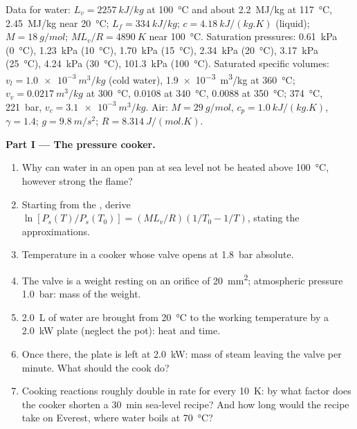 \begin{problem}
\label{pb:b1:phase-changes:1}
Data for water: $L_v = \qty{2257}{kJ/kg}$ at \qty{100}{\degreeCelsius} and
about \qty{2.2}{MJ/kg} at \qty{117}{\degreeCelsius}, \qty{2.45}{MJ/kg} near
\qty{20}{\degreeCelsius}; $L_f = \qty{334}{kJ/kg}$; $c = \qty{4.18}{kJ/(kg.K)}$
(liquid); $M = \qty{18}{g/mol}$; $ML_v/R = \qty{4890}{K}$ near
\qty{100}{\degreeCelsius}. Saturation pressures: \qty{0.61}{kPa}
(\qty{0}{\degreeCelsius}), \qty{1.23}{kPa} (\qty{10}{\degreeCelsius}), \qty{1.70}{kPa} (\qty{15}{\degreeCelsius}),
\qty{2.34}{kPa} (\qty{20}{\degreeCelsius}), \qty{3.17}{kPa} (\qty{25}{\degreeCelsius}), \qty{4.24}{kPa}
(\qty{30}{\degreeCelsius}), \qty{101.3}{kPa} (\qty{100}{\degreeCelsius}).
Saturated specific volumes: $v_l = \qty{1.0e-3}{m^3/kg}$ (cold water),
\qty{1.9e-3}{m^3/kg} at \qty{360}{\degreeCelsius}; $v_v = \qty{0.0217}{m^3/kg}$
at \qty{300}{\degreeCelsius}, $0.0108$ at \qty{340}{\degreeCelsius}, $0.0088$
at \qty{350}{\degreeCelsius};  \qty{374}{\degreeCelsius},
\qty{221}{bar}, $v_c = \qty{3.1e-3}{m^3/kg}$. Air: $M = \qty{29}{g/mol}$, $c_p =
\qty{1.0}{kJ/(kg.K)}$, $\gamma = 1.4$; $g = \qty{9.8}{m/s^2}$; $R =
\qty{8.314}{J/(mol.K)}$.

\medskip
\noindent\textbf{Part I --- The pressure cooker.}
\begin{enumerate}
  \item Why can water in an open pan at sea level not be heated above
        \qty{100}{\degreeCelsius}, however strong the flame?
  \item Starting from the , derive
        $\ln[P_s(T)/P_s(T_0)] = (ML_v/R)(1/T_0 - 1/T)$, stating the
        approximations.
  \item Temperature in a cooker whose valve opens at \qty{1.8}{bar}
        absolute.
  \item The valve is a weight resting on an orifice of \qty{20}{mm^2};
        atmospheric pressure \qty{1.0}{bar}: mass of the weight.
  \item \qty{2.0}{L} of water are brought from \qty{20}{\degreeCelsius} to the
        working temperature by a \qty{2.0}{kW} plate (neglect the pot):
        heat and time.
  \item Once there, the plate is left at \qty{2.0}{kW}: mass of steam
        leaving the valve per minute. What should the cook do?
  \item Cooking reactions roughly double in rate for every \qty{10}{K}:
        by what factor does the cooker shorten a \qty{30}{min} sea-level
        recipe? And how long would the recipe take on Everest, where
        water boils at \qty{70}{\degreeCelsius}?
\end{enumerate}


\end{problem}
